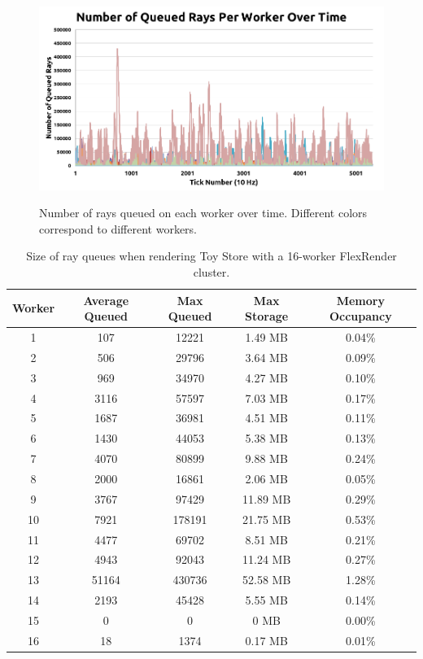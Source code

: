 \documentclass[12pt]{ucthesis}
\newcommand{\captionfonts}{\small\bf\ssp}
\begin{document}
\begin{figure}[h!]
    \centering
    \includegraphics[width=140mm]{figures/queuesize.png}
    \captionfonts
    \caption{Number of rays queued on each worker over time. Different colors correspond to different workers.}
    \label{fig:queuesize}
\end{figure}

\begin{table}
\begin{center}
\begin{tabular}{|c||c|c|c|c|}
    \hline
    Worker & Average Queued & Max Queued & Max Storage & Memory Occupancy \\
    \hline
    \hline
    1 & 107 & 12221 & 1.49 MB & 0.04\% \\
    \hline
    2 & 506 & 29796 & 3.64 MB & 0.09\% \\
    \hline
    3 & 969 & 34970 & 4.27 MB & 0.10\% \\
    \hline
    4 & 3116 & 57597 & 7.03 MB & 0.17\% \\
    \hline
    5 & 1687 & 36981 & 4.51 MB & 0.11\% \\
    \hline
    6 & 1430 & 44053 & 5.38 MB & 0.13\% \\
    \hline
    7 & 4070 & 80899 & 9.88 MB & 0.24\% \\
    \hline
    8 & 2000 & 16861 & 2.06 MB & 0.05\% \\
    \hline
    9 & 3767 & 97429 & 11.89 MB & 0.29\% \\
    \hline
    10 & 7921 & 178191 & 21.75 MB & 0.53\% \\
    \hline
    11 & 4477 & 69702 & 8.51 MB & 0.21\% \\
    \hline
    12 & 4943 & 92043 & 11.24 MB & 0.27\% \\
    \hline
    13 & 51164 & 430736 & 52.58 MB & 1.28\% \\
    \hline
    14 & 2193 & 45428 & 5.55 MB & 0.14\% \\
    \hline
    15 & 0 & 0 & 0 MB & 0.00\% \\
    \hline
    16 & 18 & 1374 & 0.17 MB & 0.01\% \\
    \hline
\end{tabular}
\caption{Size of ray queues when rendering Toy Store with a 16-worker FlexRender cluster.}
\label{tb:rayqueues}
\end{center}
\end{table}
\end{document}
